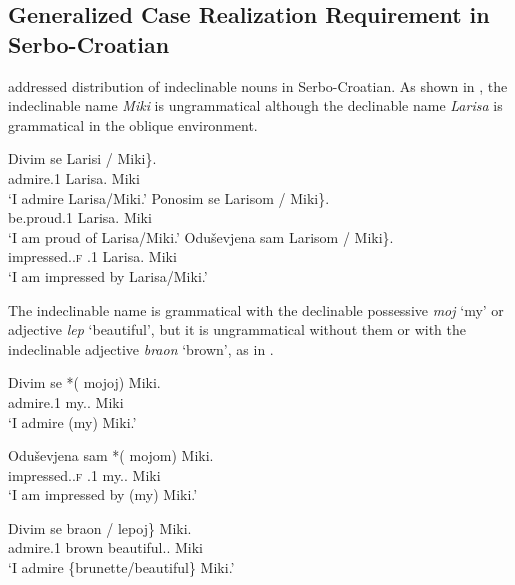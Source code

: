 \documentclass[output=paper,
]{langscibook}
\begin{document}
\subsection{Generalized Case Realization Requirement in Serbo-Croatian}


\citet{Horvath2014} addressed distribution of indeclinable nouns in Serbo-Croatian.
As shown in , 
the indeclinable name \textit{Miki} is ungrammatical although the declinable name \textit{Larisa} is grammatical in the oblique environment.

\begin{exe}
\ex\label{SCind} 
\begin{xlist}
\ex
\gll	Divim se \minsp{\{} Larisi / \minsp{*} Miki\}.\\
		admire.1{\SG} {\REFL} {} Larisa.{\DAT} {} {} Miki\\
\trans	`I admire Larisa/Miki.'
\ex
\gll	Ponosim se \minsp{\{} Larisom / \minsp{*} Miki\}.\\
		be.proud.1{\SG} {\REFL} {} Larisa.{\INS} {} {} Miki\\
\trans	`I am proud of Larisa/Miki.'
\ex
\gll	Oduševjena sam \minsp{\{} Larisom / \minsp{*} Miki\}.\\
		impressed.{\PTCP}.\textsc{f} {\AUX}.1{\SG} {} Larisa.{\INS} {} {} Miki\\\samepage
\trans	`I am impressed by Larisa/Miki.'
\hfill\citep[121]{Horvath2014}
\end{xlist}
\end{exe}

\noindent
The indeclinable name is grammatical with the declinable possessive \textit{moj} `my' or adjective \textit{lep} `beautiful', but it is ungrammatical without them or with the indeclinable adjective \textit{braon} `brown', as in .


\begin{exe}
\ex\label{SCmy}  
\begin{xlist}
\ex
\gll	Divim se *(\hspace{-2pt} mojoj) Miki.\\
		admire.1{\SG} {\REFL} {} my.{\DAT.\SG} Miki\\
\trans	`I admire (my) Miki.'

\ex
\gll	Oduševjena sam *(\hspace{-2pt} mojom) Miki.\\
		impressed.{\SG}.\textsc{f} {\AUX}.1{\SG} {} my.{\INS}.{\SG} Miki\\
\trans	`I am impressed by (my) Miki.'

\ex
\gll	Divim se \minsp{\{*} braon / lepoj\} Miki.\\
		admire.1{\SG} {\REFL} {} brown {} beautiful.{\DAT}.{\SG} Miki\\
\trans	`I admire \{brunette/beautiful\} Miki.'
\hfill\citep[121]{Horvath2014}
\end{xlist}
\end{exe}
\end{document}
